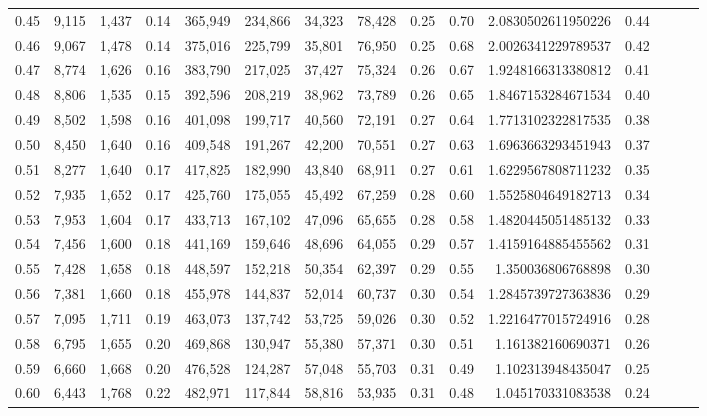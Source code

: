 \begin{tabular}{rrrrrrrrrrrrrrr}
0.45 &   9,115 &  1,437 &  0.14 &  365,949 &  234,866 &   34,323 &   78,428 &  0.25 &  0.70 &    2.0830502611950226 &      0.44 \\
0.46 &   9,067 &  1,478 &  0.14 &  375,016 &  225,799 &   35,801 &   76,950 &  0.25 &  0.68 &    2.0026341229789537 &      0.42 \\
0.47 &   8,774 &  1,626 &  0.16 &  383,790 &  217,025 &   37,427 &   75,324 &  0.26 &  0.67 &    1.9248166313380812 &      0.41 \\
0.48 &   8,806 &  1,535 &  0.15 &  392,596 &  208,219 &   38,962 &   73,789 &  0.26 &  0.65 &    1.8467153284671534 &      0.40 \\
0.49 &   8,502 &  1,598 &  0.16 &  401,098 &  199,717 &   40,560 &   72,191 &  0.27 &  0.64 &    1.7713102322817535 &      0.38 \\
0.50 &   8,450 &  1,640 &  0.16 &  409,548 &  191,267 &   42,200 &   70,551 &  0.27 &  0.63 &    1.6963663293451943 &      0.37 \\
0.51 &   8,277 &  1,640 &  0.17 &  417,825 &  182,990 &   43,840 &   68,911 &  0.27 &  0.61 &    1.6229567808711232 &      0.35 \\
0.52 &   7,935 &  1,652 &  0.17 &  425,760 &  175,055 &   45,492 &   67,259 &  0.28 &  0.60 &    1.5525804649182713 &      0.34 \\
0.53 &   7,953 &  1,604 &  0.17 &  433,713 &  167,102 &   47,096 &   65,655 &  0.28 &  0.58 &    1.4820445051485132 &      0.33 \\
0.54 &   7,456 &  1,600 &  0.18 &  441,169 &  159,646 &   48,696 &   64,055 &  0.29 &  0.57 &    1.4159164885455562 &      0.31 \\
0.55 &   7,428 &  1,658 &  0.18 &  448,597 &  152,218 &   50,354 &   62,397 &  0.29 &  0.55 &     1.350036806768898 &      0.30 \\
0.56 &   7,381 &  1,660 &  0.18 &  455,978 &  144,837 &   52,014 &   60,737 &  0.30 &  0.54 &    1.2845739727363836 &      0.29 \\
0.57 &   7,095 &  1,711 &  0.19 &  463,073 &  137,742 &   53,725 &   59,026 &  0.30 &  0.52 &    1.2216477015724916 &      0.28 \\
0.58 &   6,795 &  1,655 &  0.20 &  469,868 &  130,947 &   55,380 &   57,371 &  0.30 &  0.51 &     1.161382160690371 &      0.26 \\
0.59 &   6,660 &  1,668 &  0.20 &  476,528 &  124,287 &   57,048 &   55,703 &  0.31 &  0.49 &     1.102313948435047 &      0.25 \\
0.60 &   6,443 &  1,768 &  0.22 &  482,971 &  117,844 &   58,816 &   53,935 &  0.31 &  0.48 &     1.045170331083538 &      0.24 \\

\end{tabular}
